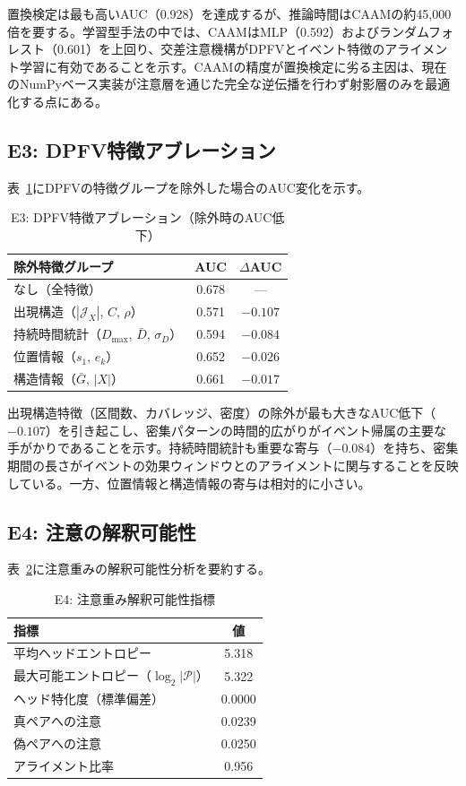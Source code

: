 \documentclass[sigconf,nonacm]{acmart}
\begin{document}
置換検定は最も高いAUC（0.928）を達成するが、推論時間はCAAMの約45,000倍を要する。学習型手法の中では、CAAMはMLP（0.592）およびランダムフォレスト（0.601）を上回り、交差注意機構がDPFVとイベント特徴のアライメント学習に有効であることを示す。CAAMの精度が置換検定に劣る主因は、現在のNumPyベース実装が注意層を通じた完全な逆伝播を行わず射影層のみを最適化する点にある。

\subsection{E3: DPFV特徴アブレーション}

表~\ref{tab:ablation}にDPFVの特徴グループを除外した場合のAUC変化を示す。

\begin{table}[t]
\caption{E3: DPFV特徴アブレーション（除外時のAUC低下）}
\label{tab:ablation}
\centering
\begin{tabular}{lcc}
\toprule
\textbf{除外特徴グループ} & \textbf{AUC} & \textbf{$\Delta$AUC} \\
\midrule
なし（全特徴）          & 0.678 & ---  \\
出現構造（$|\mathcal{J}_X|$, $C$, $\rho$）  & 0.571 & $-0.107$ \\
持続時間統計（$D_{\max}$, $\bar{D}$, $\sigma_D$） & 0.594 & $-0.084$ \\
位置情報（$s_1$, $e_k$）       & 0.652 & $-0.026$ \\
構造情報（$\bar{G}$, $|X|$）   & 0.661 & $-0.017$ \\
\bottomrule
\end{tabular}
\end{table}

出現構造特徴（区間数、カバレッジ、密度）の除外が最も大きなAUC低下（$-0.107$）を引き起こし、密集パターンの時間的広がりがイベント帰属の主要な手がかりであることを示す。持続時間統計も重要な寄与（$-0.084$）を持ち、密集期間の長さがイベントの効果ウィンドウとのアライメントに関与することを反映している。一方、位置情報と構造情報の寄与は相対的に小さい。

\subsection{E4: 注意の解釈可能性}

表~\ref{tab:e2}に注意重みの解釈可能性分析を要約する。

\begin{table}[t]
\caption{E4: 注意重み解釈可能性指標}
\label{tab:e2}
\centering
\begin{tabular}{lc}
\toprule
\textbf{指標} & \textbf{値} \\
\midrule
平均ヘッドエントロピー & 5.318 \\
最大可能エントロピー（$\log_2 |\mathcal{P}|$） & 5.322 \\
ヘッド特化度（標準偏差） & 0.0000 \\
真ペアへの注意 & 0.0239 \\
偽ペアへの注意 & 0.0250 \\
アライメント比率 & 0.956 \\
\bottomrule
\end{tabular}
\end{table}
\end{document}
